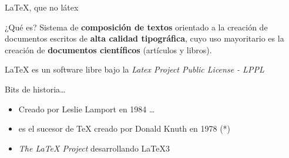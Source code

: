 \begin{frame}{\LaTeX, que no látex}
    
    \begin{block}{¿Qué es?}
        Sistema de \textbf{composición de textos} orientado a la creación de documentos escritos de \textbf{alta calidad tipográfica}, cuyo uso mayoritario es la creación de \textbf{documentos científicos} (artículos y libros).

        \LaTeX{} es un software libre bajo la \textit{Latex Project Public License - LPPL}
    \end{block}
    \pause
    \hspace{2cm}


    \begin{block}{Bits de historia\ldots{}}
        \begin{itemize}
            \item Creado por Leslie Lamport en 1984 \ldots{}
            \pause
            \item es el sucesor de TeX creado por Donald Knuth en 1978 (*)
            \pause
            \item \textit{The \LaTeX{} Project} desarrollando \LaTeX{}3 
        \end{itemize}
    \end{block}
    
\end{frame}
